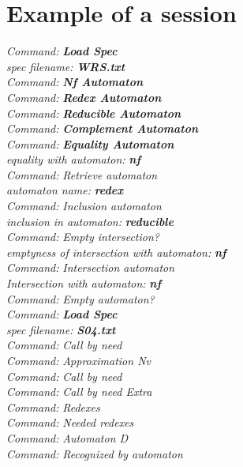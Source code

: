 \documentclass[11pt]{llncs}
\def\autocom#1{\textsl{#1 }}
\def\autocombf#1{{\bf \textsl{#1}}}
\begin{document}
\section{Example of a session}
\noindent
\autocom{Command:} \autocombf{Load Spec}\\
\autocom{spec filename:} \autocombf{WRS.txt}\\
\autocom{Command:} \autocombf{Nf Automaton}\\
\autocom{Command:} \autocombf{Redex Automaton}\\
\autocom{Command:} \autocombf{Reducible Automaton}\\
\autocom{Command:} \autocombf{Complement Automaton}\\
\autocom{Command:} \autocombf{Equality Automaton}\\
\autocom{equality with automaton:} \autocombf{nf}\\
\autocom{Command:} \autocom{Retrieve automaton}\\
\autocom{automaton name:} \autocombf{redex}\\
\autocom{Command:} \autocom{Inclusion automaton}\\
\autocom{inclusion in automaton:} \autocombf{reducible}\\
\autocom{Command:} \autocom{Empty intersection?}\\
\autocom{emptyness of intersection with automaton:} \autocombf{nf}\\
\autocom{Command:} \autocom{Intersection automaton}\\
\autocom{Intersection with automaton:} \autocombf{nf}\\
\autocom{Command:} \autocom{Empty automaton?}\\
\autocom{Command:} \autocombf{Load Spec}\\
\autocom{spec filename:} \autocombf{S04.txt}\\
\autocom{Command:} \autocom{Call by need}\\
\autocom{Command:} \autocom{Approximation Nv}\\
\autocom{Command:} \autocom{Call by need}\\
\autocom{Command:} \autocom{Call by need Extra}\\
\autocom{Command:} \autocom{Redexes}\\
\autocom{Command:} \autocom{Needed redexes}\\
\autocom{Command:} \autocom{Automaton D}\\
\autocom{Command:} \autocom{Recognized by automaton}\\
\end{document}
